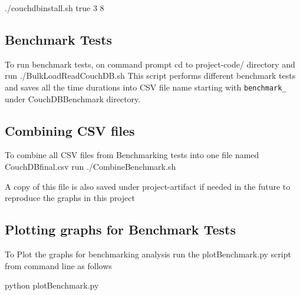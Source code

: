 ./couchdbinstall.sh true 3 8 

\subsection{Benchmark Tests}
To run benchmark tests, on command prompt cd to project-code/ directory and run
./BulkLoadReadCouchDB.sh
This script performs different benchmark tests and saves all the time
durations into CSV file name starting with \verb|benchmark_| under
CouchDBBenchmark directory.

\subsection{Combining CSV files}
To combine all CSV files from Benchmarking tests into one file named CouchDBfinal.csv run
./CombineBenchmark.sh 


A copy of this file is also saved under project-artifact if needed in
the future to reproduce the graphs in this project

\subsection{Plotting graphs for Benchmark Tests}
To Plot the graphs for benchmarking analysis run the 
plotBenchmark.py script from command line as follows

python plotBenchmark.py











